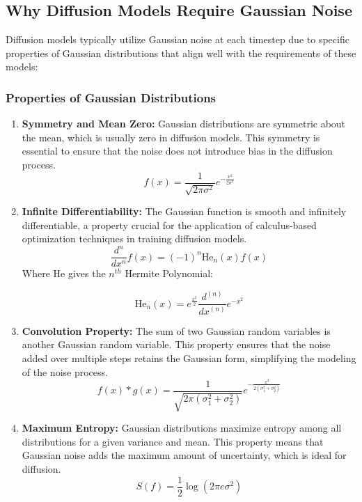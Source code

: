 \documentclass[12pt]{article}
\begin{document}
\subsection*{Why Diffusion Models Require Gaussian Noise}

Diffusion models typically utilize Gaussian noise at each timestep due to specific properties of Gaussian distributions that align well with the requirements of these models:

\subsubsection*{Properties of Gaussian Distributions}
\begin{enumerate}
    \item \textbf{Symmetry and Mean Zero:}
    Gaussian distributions are symmetric about the mean, which is usually zero in diffusion models. This symmetry is essential to ensure that the noise does not introduce bias in the diffusion process.
    \[
    f(x) = \frac{1}{\sqrt{2\pi\sigma^2}} e^{-\frac{x^2}{2\sigma^2}}
    \]
    
    \item \textbf{Infinite Differentiability:}
    The Gaussian function is smooth and infinitely differentiable, a property crucial for the application of calculus-based optimization techniques in training diffusion models.
    \[
    \frac{d^n}{dx^n}f(x) = (-1)^n\text{He}_n(x)f(x)
    \]
Where He gives the \(n^{th}\) Hermite Polynomial:

\[\text{He}_n(x)=e^{\frac{x^2}{2}}\frac{d^{(n)}}{dx^(n)}e^{-x^2}\]

    \item \textbf{Convolution Property:}
    The sum of two Gaussian random variables is another Gaussian random variable. This property ensures that the noise added over multiple steps retains the Gaussian form, simplifying the modeling of the noise process.
    \[
    f(x) * g(x) = \frac{1}{\sqrt{2\pi (\sigma_1^2 + \sigma_2^2)}} e^{-\frac{x^2}{2 (\sigma_1^2 + \sigma_2^2)}}
    \]
    
    \item \textbf{Maximum Entropy:}
    Gaussian distributions maximize entropy among all distributions for a given variance and mean. This property means that Gaussian noise adds the maximum amount of uncertainty, which is ideal for diffusion.
    \[
    S(f) = \frac{1}{2} \log(2\pi e \sigma^2)
    \]
\end{enumerate}
\end{document}
